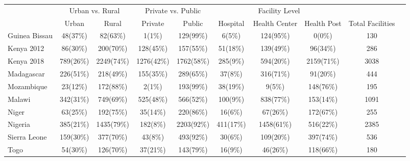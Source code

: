 \def\sym#1{\ifmmode^{#1}\else\(^{#1}\)\fi}
\begin{tabular}{l*{9}{c}}
\hline\hline
&\multicolumn{2}{c}{Urban vs. Rural} &\multicolumn{2}{c}{Private vs. Public}  &\multicolumn{3}{c}{Facility Level}    \\\cmidrule(lr){2-3}\cmidrule(lr){4-5}\cmidrule(lr){6-8}
&\multicolumn{1}{c}{Urban}&\multicolumn{1}{c}{Rural}&\multicolumn{1}{c}{Private}&\multicolumn{1}{c}{Public}&\multicolumn{1}{c}{Hospital}&\multicolumn{1}{c}{Health Center}&\multicolumn{1}{c}{Health Post}&\multicolumn{1}{c}{Total Facilities}&\\
\hline
Guinea Bissau&         {48(37\%)}&        {82(63\%)}&    {1(1\%)}&        {129(99\%)}&    {6(5\%)}&               {124(95\%)}&             {0(0\%)}&             {130}\\
Kenya 2012&            {86(30\%)}&        {200(70\%)}&    {128(45\%)}&        {157(55\%)}&    {51(18\%)}&               {139(49\%)}&             {96(34\%)}&             {286}\\
Kenya 2018&        {789(26\%)}&    {2249(74\%)}&    {1276(42\%)}&    {1762(58\%)}&        {285(9\%)}&               {594(20\%)}&             {2159(71\%)}&             {3038}\\
Madagascar&        {226(51\%)}&    {218(49\%)}&    {155(35\%)}&    {289(65\%)}&        {37(8\%)}&               {316(71\%)}&             {91(20\%)}&             {444}\\
Mozambique&        {23(12\%)}&    {172(88\%)}&    {2(1\%)}&    {193(99\%)}&        {38(19\%)}&               {9(5\%)}&             {148(76\%)}&             {195}\\
Malawi&                {342(31\%)}&        {749(69\%)}&    {525(48\%)}&    {566(52\%)}&        {100(9\%)}&               {838(77\%)}&             {153(14\%)}&             {1091}\\
Niger&                 {63(25\%)}&        {192(75\%)}&    {35(14\%)}&    {220(86\%)}&        {16(6\%)}&               {67(26\%)}&             {172(67\%)}&             {255}\\
Nigeria&               {385(21\%)}&        {1435(79\%)}&    {182(8\%)}&    {2203(92\%)}&        {411(17\%)}&               {1458(61\%)}&             {516(22\%)}&             {2385}\\
Sierra Leone&      {159(30\%)}&    {377(70\%)}&    {43(8\%)}&    {493(92\%)}&        {30(6\%)}&               {109(20\%)}&             {397(74\%)}&             {536}\\
Togo&                  {54(30\%)}&  {126(70\%)}&        {37(21\%)}&  {143(79\%)}&        {16(9\%)}&             {46(26\%)}&             {118(66\%)}&             {180}\\

\end{tabular}
